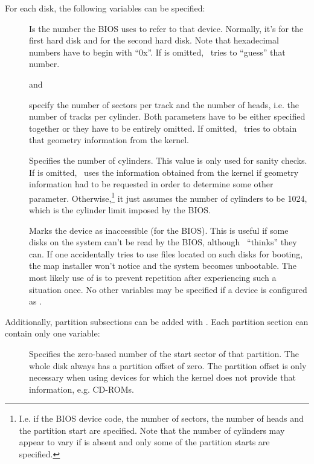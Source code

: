 For each disk, the following variables can be specified:
\begin{description}
  \item[] Is the number the BIOS uses
    to refer to that device. Normally, it's  for the first hard
    disk and  for the second hard disk. Note that hexadecimal
    numbers have to begin with ``0x''. If  is omitted,
    \LILO\ tries to ``guess'' that number.
  \item[] and
  \item[] specify the number of sectors per
    track and the number of heads, i.e. the number of tracks per
    cylinder. Both parameters have to be either specified together or
    they have to be entirely omitted. If omitted, \LILO\ tries to obtain
    that geometry information from the kernel.
  \item[] Specifies the number of cylinders.
    This value is only used for sanity checks. If  is omitted,
    \LILO\ uses the information obtained from the kernel if geometry
    information had to be requested in order to determine some other
    parameter. Otherwise,\footnote{I.e. if the BIOS device code, the number
    of sectors, the number of heads and the partition start are specified.
    Note that the number of cylinders may appear to vary if 
    is absent and only some of the partition starts are specified.} it just
    assumes the number of cylinders to be 1024, which is the cylinder limit
    imposed by the BIOS.
  \item[] Marks the device as inaccessible (for the BIOS).
    This is useful if some disks on the system can't be read by the BIOS,
    although \LILO\ ``thinks'' they can. If one accidentally tries to use
    files located on such disks for booting, the map installer won't notice
    and the system becomes unbootable. The most likely use of
     is to prevent repetition after experiencing such a
    situation once. No other variables may be specified if a device is
    configured as .
\end{description}

Additionally, partition subsections can be added with
. Each partition section can
contain only one variable:
\begin{description}
  \item[] Specifies the zero-based
    number of the start sector of that partition. The whole disk always
    has a partition offset of zero. The partition offset is only necessary
    when using devices for which the kernel does not provide that
    information, e.g. CD-ROMs.
\end{description}

